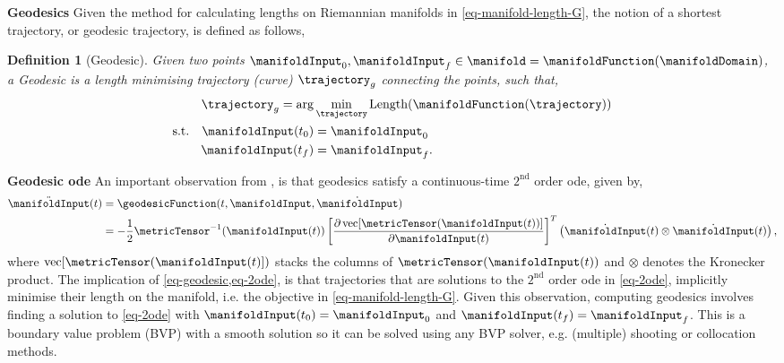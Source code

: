 \documentclass{mimosis-class/mimosis}
\newtheorem{definition}{Definition}[section]
\numberwithin{equation}{chapter}
\begin{document}
{\begin{myquote}
\textbf{Geodesics}
Given the method for calculating lengths on Riemannian manifolds in \cref{eq-manifold-length-G},
the notion of a shortest trajectory, or geodesic trajectory, is defined as follows,
\begin{definition}[Geodesic]
Given two points $\manifoldInput_0, \manifoldInput_f \in
\manifold = \manifoldFunction(\manifoldDomain)$, a Geodesic is a length minimising trajectory (curve)
$\trajectory_g$ connecting the points, such that,
\begin{subequations} \label{eq-geodesic}
\begin{align}
  \trajectory_{g} =\arg &\min_{\trajectory} \operatorname{Length}(\manifoldFunction(\trajectory)) \\
\text{s.t.} \quad  \manifoldInput(t_0)&=\manifoldInput_{0} \\
  \manifoldInput(t_f)&=\manifoldInput_{f}.
\end{align}
\end{subequations}
\end{definition}
\end{myquote}
\textbf{Geodesic \acrshort{ode}} An important observation from \cite{carmoRiemannian1992}, is that geodesics
satisfy a continuous-time \(2^{\text{nd}}\) order \acrshort{ode}, given by,
\begin{align} \label{eq-2ode}
 \ddot{\manifoldInput}(t)
&= \geodesicFunction(t, \manifoldInput, \dot{\manifoldInput}) \nonumber \\
&=-\frac{1}{2} \metricTensor^{-1}(\manifoldInput(t))\left[
\frac{\partial \operatorname{vec}[\metricTensor(\manifoldInput(t))]}{\partial \manifoldInput(t)}
\right]^{T}\left(\dot{\manifoldInput}(t) \otimes \dot{\manifoldInput}(t)\right),
\end{align}
where \(\operatorname{vec}[\metricTensor(\manifoldInput(t)])\) stacks the columns of \(\metricTensor(\manifoldInput(t))\)
and \(\otimes\) denotes the Kronecker product.
The implication of \cref{eq-geodesic,eq-2ode}, is that trajectories that are solutions
to the \(2^{\text{nd}}\) order \acrshort{ode} in \cref{eq-2ode}, implicitly minimise their length on the manifold,
i.e. the objective in \cref{eq-manifold-length-G}.
Given this observation, computing geodesics involves finding a solution to \cref{eq-2ode}
with \(\manifoldInput(t_0) = \manifoldInput_0\) and \(\manifoldInput(t_f) = \manifoldInput_f\).
This is a boundary value problem (BVP) with a smooth solution so it can be solved using
any BVP solver, e.g. (multiple) shooting or collocation methods.
}
\end{document}
